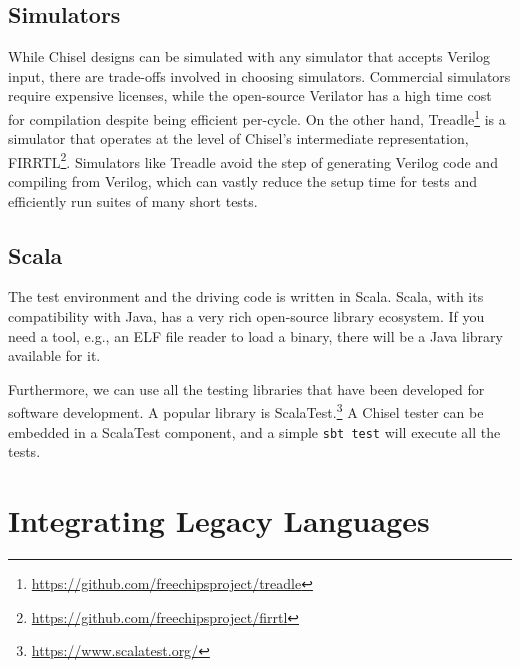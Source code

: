 \documentclass[conference]{IEEEtran}
\newcommand{\code}[1]{{\small{\texttt{#1}}}}
\newcommand{\todo}[1]{{\color{olive} TODO: #1}}
\newcommand{\martin}[1]{{\color{blue} Martin: #1}}
\renewcommand{\todo}[1]{}
\renewcommand{\martin}[1]{}
\begin{document}
\subsection{Simulators}

While Chisel designs can be simulated with any simulator that accepts Verilog input, there are trade-offs involved in choosing simulators.
Commercial simulators require expensive licenses, while the open-source Verilator has a high time cost for compilation despite being efficient per-cycle.
On the other hand, Treadle\footnote{\url{https://github.com/freechipsproject/treadle}} is a simulator that operates at the level of Chisel's intermediate representation, FIRRTL\footnote{\url{https://github.com/freechipsproject/firrtl}}.
Simulators like Treadle avoid the step of generating Verilog code and compiling from Verilog, which can vastly reduce the setup time for tests and efficiently run suites of many short tests.

\todo{Verilator?}

\martin{Maybe a few words from Richard on Treadle, Simon on Verilator?}


\subsection{Scala}

The test environment and the driving code is written in Scala. Scala, with its
compatibility with Java, has a very rich open-source library ecosystem.
If you need a tool, e.g., an ELF file reader to load a binary, there will be a Java
library available for it.

Furthermore, we can use all the testing libraries that have been developed for
software development. A popular library is ScalaTest.\footnote{\url{https://www.scalatest.org/}}
A Chisel tester can be embedded
in a ScalaTest component, and a simple \code{sbt test} will execute all the tests.

\todo{Check what ScalaCheck can offer.}

\section{Integrating Legacy Languages}
\label{sec:legacy}
\end{document}
